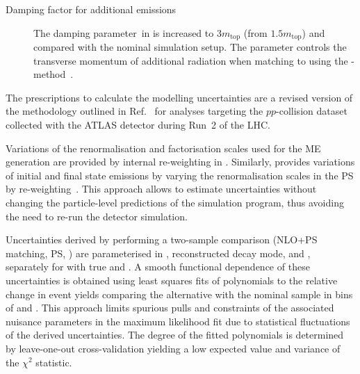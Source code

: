 \begin{description}
\item[Damping factor for additional emissions] The damping
  parameter~\hdamp in \POWHEGBOX[v2] is increased to $3 m_\text{top}$
  (from $1.5 m_\text{top}$) and compared with the nominal simulation
  setup. The \hdamp parameter controls the transverse momentum of
  additional radiation when matching \POWHEGBOX[v2] to \PYTHIA[8]
  using the
  \POWHEG-method~\cite{ATL-PHYS-PUB-2016-020,ATL-PHYS-PUB-2020-023}.

\end{description}
The prescriptions to calculate the \ttbar modelling uncertainties are
a revised version of the methodology outlined in
Ref.~\cite{ATL-PHYS-PUB-2020-023} for analyses targeting the
$pp$-collision dataset collected with the ATLAS detector during Run~2
of the LHC.

Variations of the renormalisation and factorisation scales used for
the ME generation are provided by internal re-weighting in
\POWHEGBOX[v2]. Similarly, \PYTHIA[8] provides variations of initial
and final state emissions by varying the renormalisation scales in the
PS by re-weighting~\cite{Mrenna:2016sih,pythia-variations-online}. This
approach allows to estimate uncertainties without changing the
particle-level predictions of the simulation program, thus avoiding
the need to re-run the detector simulation.

Uncertainties derived by performing a two-sample comparison (NLO+PS
matching, PS, \hdamp) are parameterised in \tauhadvis \pT,
reconstructed \tauhadvis decay mode, and \mTW, separately for \ttbar
with true and \faketauhadvis. A smooth functional dependence of these
uncertainties is obtained using least squares fits of polynomials to
the relative change in event yields comparing the alternative with the
nominal sample in bins of \tauhadvis \pT and \mTW. This approach
limits spurious pulls and constraints of the associated nuisance
parameters in the maximum likelihood fit due to statistical
fluctuations of the derived uncertainties. The degree of the fitted
polynomials is determined by leave-one-out cross-validation yielding a
low expected value and variance of the $\chi^2$ statistic.

